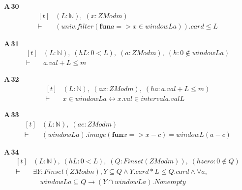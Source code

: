 \noindent\textbf{A\,30}\quad{}
{\footnotesize\[ \begin{aligned}[t]
&(\mathit{L} : \mathbb{N} ),\; (\mathit{x} : \mathit{ZMod} \mathit{m})\\
\vdash\;&(\mathit{univ}.\mathit{filter} (\mathbf{fun} \mathit{a} => \mathit{x} \in \mathit{window} \mathit{L} \mathit{a})).\mathit{card} \leq \mathit{L}
\end{aligned} \]}

\noindent\textbf{A\,31}\quad{}
{\footnotesize\[ \begin{aligned}[t]
&(\mathit{L} : \mathbb{N} ),\; (\mathit{hL} : 0<\mathit{L}),\; (\mathit{a} : \mathit{ZMod} \mathit{m}),\; (\mathit{h} : 0 \notin \mathit{window} \mathit{L} \mathit{a})\\
\vdash\;&\mathit{a}.\mathit{val}+\mathit{L} \leq \mathit{m}
\end{aligned} \]}

\noindent\textbf{A\,32}\quad{}
{\footnotesize\[ \begin{aligned}[t]
&(\mathit{L} : \mathbb{N} ),\; (\mathit{a} \mathit{x} : \mathit{ZMod} \mathit{m}),\; (\mathit{ha} : \mathit{a}.\mathit{val}+\mathit{L} \leq \mathit{m})\\
\vdash\;&\mathit{x} \in \mathit{window} \mathit{L} \mathit{a} \leftrightarrow \mathit{x}.\mathit{val} \in \mathit{interval} \mathit{a}.\mathit{val} \mathit{L}
\end{aligned} \]}

\noindent\textbf{A\,33}\quad{}
{\footnotesize\[ \begin{aligned}[t]
&(\mathit{L} : \mathbb{N} ),\; (\mathit{a} \mathit{c} : \mathit{ZMod} \mathit{m})\\
\vdash\;&(\mathit{window} \mathit{L} \mathit{a}).\mathit{image} (\mathbf{fun} \mathit{x} => \mathit{x}-\mathit{c})=\mathit{window} \mathit{L} (\mathit{a}-\mathit{c})
\end{aligned} \]}

\noindent\textbf{A\,34}\quad{}
{\footnotesize\[ \begin{aligned}[t]
&(\mathit{L} : \mathbb{N} ),\; (\mathit{hL} : 0<\mathit{L}),\; (\mathit{Q} : \mathit{Finset} (\mathit{ZMod} \mathit{m})),\; (\mathit{hzero} : 0 \notin \mathit{Q})\\
\vdash\;&\exists \mathit{Y} : \mathit{Finset} (\mathit{ZMod} \mathit{m}),\mathit{Y} \subseteq \mathit{Q} \wedge \mathit{Y}.\mathit{card}*\mathit{L} \leq \mathit{Q}.\mathit{card} \wedge \forall \mathit{a},\\
&\quad \mathit{window} \mathit{L} \mathit{a} \subseteq \mathit{Q} \to (\mathit{Y} \cap \mathit{window} \mathit{L} \mathit{a}).\mathit{Nonempty}
\end{aligned} \]}

